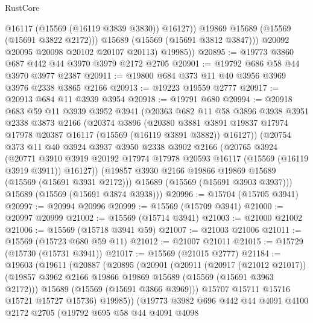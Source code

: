 \begin{lexlean}{RustCore}
\begin{coremodule}
                  @16117
                  (@15569 (@16119 @3839 @3830))
                  @16127))
              @19869
              @15689
              (@15569 (@15691 @3822 @2172)))
            @15689
            (@15569 (@15691 @3812 @3847)))
          @20092
          @20095
          @20098
          @20102
          @20107
          @20113)
        @19985))
@20895 := @19773 @3860 @687 @442 @44 @3970 @3979 @2172 @2705
@20901 := @19792 @686 @58 @44 @3970 @3977 @2387
@20911 := @19800 @684 @373 @11 @40 @3956 @3969 @3976 @2338 @3865 @2166
@20913 := @19223 @19559 @2777
@20917 := @20913 @684 @11 @3939 @3954
@20918 := @19791 @680
@20994 := @20918
    @683
    @59
    @11
    @3939
    @3952
    @3941
    (@20363
      @682
      @11
      @58
      @3896
      @3938
      @3951
      @2338
      @3873
      @2166
      (@20374
        @3896
        (@20380
          @3881
          @3891
          @19837
          @17974
          @17978
          @20387
          @16117
          (@15569 (@16119 @3891 @3882))
          @16127))
      (@20754
        @373
        @11
        @40
        @3924
        @3937
        @3950
        @2338
        @3902
        @2166
        (@20765
          @3924
          (@20771
            @3910
            @3919
            @20192
            @17974
            @17978
            @20593
            @16117
            (@15569 (@16119 @3919 @3911))
            @16127))
        (@19857 @3930 @2166 @19866 @19869 @15689 (@15569 (@15691 @3931 @2172)))
        @15689
        (@15569 (@15691 @3903 @3937)))
      @15689
      (@15569 (@15691 @3874 @3938)))
@20996 := @15704 (@15705 @3941)
@20997 := @20994 @20996
@20999 := @15569 (@15709 @3941)
@21000 := @20997 @20999
@21002 := @15569 (@15714 @3941)
@21003 := @21000 @21002
@21006 := @15569 (@15718 @3941 @59)
@21007 := @21003 @21006
@21011 := @15569 (@15723 @680 @59 @11)
@21012 := @21007 @21011
@21015 := @15729 (@15730 (@15731 @3941))
@21017 := @15569 (@21015 @2777)
@21184 := @19603
    (@19611
      (@20887
        (@20895
          (@20901
            (@20911
              (@20917 (@21012 @21017))
              (@19857 @3962 @2166 @19866 @19869 @15689 (@15569 (@15691 @3963 @2172)))
              @15689
              (@15569 (@15691 @3866 @3969)))
            @15707
            @15711
            @15716
            @15721
            @15727
            @15736)
          @19985))
      (@19773
        @3982
        @696
        @442
        @44
        @4091
        @4100
        @2172
        @2705
        (@19792
          @695
          @58
          @44
          @4091
          @4098

\end{coremodule}
\end{lexlean}
